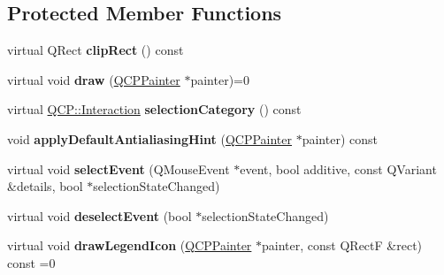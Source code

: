 \subsection*{Protected Member Functions}
\begin{DoxyCompactItemize}
\item 
\hypertarget{class_q_c_p_abstract_plottable_aafb817dbea97d2798967f3371a701413}{}\label{class_q_c_p_abstract_plottable_aafb817dbea97d2798967f3371a701413} 
virtual Q\+Rect {\bfseries clip\+Rect} () const
\item 
\hypertarget{class_q_c_p_abstract_plottable_acbab5e30dcd04fd302b4a5902ac2c482}{}\label{class_q_c_p_abstract_plottable_acbab5e30dcd04fd302b4a5902ac2c482} 
virtual void {\bfseries draw} (\hyperlink{class_q_c_p_painter}{Q\+C\+P\+Painter} $\ast$painter)=0
\item 
\hypertarget{class_q_c_p_abstract_plottable_afb5e4718c232a16d0fb06b00e172be9e}{}\label{class_q_c_p_abstract_plottable_afb5e4718c232a16d0fb06b00e172be9e} 
virtual \hyperlink{namespace_q_c_p_a2ad6bb6281c7c2d593d4277b44c2b037}{Q\+C\+P\+::\+Interaction} {\bfseries selection\+Category} () const
\item 
\hypertarget{class_q_c_p_abstract_plottable_a59a80773c5cefc05a0646ac8e1149ed5}{}\label{class_q_c_p_abstract_plottable_a59a80773c5cefc05a0646ac8e1149ed5} 
void {\bfseries apply\+Default\+Antialiasing\+Hint} (\hyperlink{class_q_c_p_painter}{Q\+C\+P\+Painter} $\ast$painter) const
\item 
\hypertarget{class_q_c_p_abstract_plottable_a16aaad02456aa23a759efd1ac90c79bf}{}\label{class_q_c_p_abstract_plottable_a16aaad02456aa23a759efd1ac90c79bf} 
virtual void {\bfseries select\+Event} (Q\+Mouse\+Event $\ast$event, bool additive, const Q\+Variant \&details, bool $\ast$selection\+State\+Changed)
\item 
\hypertarget{class_q_c_p_abstract_plottable_a6fa0d0f95560ea8b01ee13f296dab2b1}{}\label{class_q_c_p_abstract_plottable_a6fa0d0f95560ea8b01ee13f296dab2b1} 
virtual void {\bfseries deselect\+Event} (bool $\ast$selection\+State\+Changed)
\item 
\hypertarget{class_q_c_p_abstract_plottable_a9a450783fd9ed539e589999fd390cdf7}{}\label{class_q_c_p_abstract_plottable_a9a450783fd9ed539e589999fd390cdf7} 
virtual void {\bfseries draw\+Legend\+Icon} (\hyperlink{class_q_c_p_painter}{Q\+C\+P\+Painter} $\ast$painter, const Q\+RectF \&rect) const =0
\item 
\hypertarget{class_q_c_p_abstract_plottable_a345d702b2e7e12c8cfdddff65ba85e8c}{}\label{class_q_c_p_abstract_plottable_a345d702b2e7e12c8cfdddff65ba85e8c} 

\end{DoxyCompactItemize}
